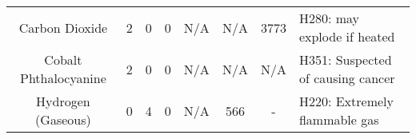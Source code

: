 \begin{landscape}
\begin{table}[h]
\begin{tabular}{@{}cccccccl@{}}
Carbon Dioxide                                                                            & 2                                       & 0                                             & 0                                           & N/A                                                                                   & N/A                                                                                                     & 3773                                                                                                  & H280: may explode if heated                                                                                                                                                                                                                                                                                                                   \\
Cobalt Phthalocyanine                                                                     & 2                                       & 0                                             & 0                                           & N/A                                                                                   & N/A                                                                                                     & N/A                                                                                                   & H351: Suspected of causing cancer                                                                                                                                                                                                                                                                                                             \\
Hydrogen (Gaseous)                                                                        & 0                                       & 4                                             & 0                                           & N/A                                                                                   & 566                                                                                                     & -                                                                                                     & H220: Extremely flammable gas                                                                                                                                                                                                                                                                                                                 \\

\end{tabular}
\end{table}
\end{landscape}

